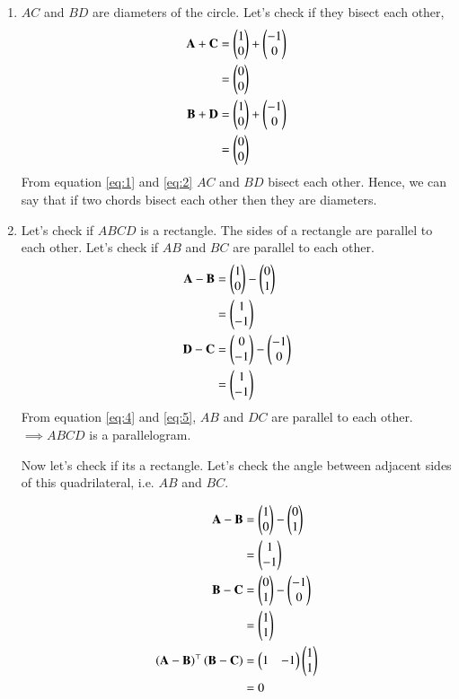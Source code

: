 \documentclass[journal,12pt,twocolumn]{IEEEtran}
\let\vec\mathbf
\begin{document}
\begin{enumerate}
    \item $AC$ and $BD$ are diameters of the circle. Let's check if they bisect each other,
    \begin{align}
        \vec{A} + \vec{C} &= \myvec{1 \\ 0} + \myvec{-1 \\ 0}\\
        \label{eq:1} &= \myvec{0 \\ 0} \\
        \vec{B} + \vec{D} &= \myvec{1 \\ 0} + \myvec{-1 \\ 0}\\
        \label{eq:2} &= \myvec{0 \\ 0}
    \end{align}
    From equation \eqref{eq:1} and \eqref{eq:2} $AC$ and $BD$ bisect each other.
    Hence, we can say that if two chords bisect each other then they are diameters.

    \item Let's check if $ABCD$ is a rectangle.
    The sides of a rectangle are parallel to each other. Let's check if $AB$ and $BC$ are parallel to each other.
    \begin{align}
        \vec{A} - \vec{B} &= \myvec{1 \\ 0} - \myvec{0 \\ 1}\\
        \label{eq:4} &= \myvec{1 \\ -1} \\
        \vec{D} - \vec{C} &= \myvec{0\\ -1} - \myvec{-1 \\ 0}\\
        \label{eq:5} &= \myvec{1 \\ -1} 
    \end{align}
    From equation \eqref{eq:4} and \eqref{eq:5}, $AB$ and $DC$ are parallel to each other.
    $\implies ABCD$ is a parallelogram.

    Now let's check if its a rectangle.
    Let's check the angle between adjacent sides of this quadrilateral, i.e. $AB$ and $BC$.

    \begin{align}
        \vec{A} - \vec{B} &= \myvec{1 \\ 0} - \myvec{0 \\ 1} \\
        &= \myvec{1 \\ -1} \\
        \vec{B} - \vec{C} &= \myvec{0 \\ 1} - \myvec{-1 \\ 0} \\
        &= \myvec{1 \\ 1} \\
        \label{eq:6} \brak{\vec{A} - \vec{B}}^\top \brak{\vec{B} - \vec{C}} &=  \myvec{1 & -1} \myvec{1 \\ 1} \\
        &= 0
    \end{align}


\end{enumerate}
\end{document}
